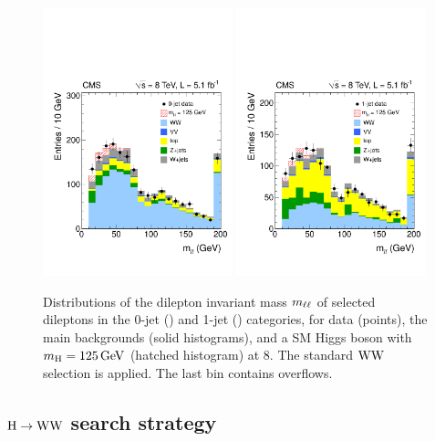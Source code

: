 \documentclass[12pt,twoside,a4paper,cmspaper,final,collab]{cms-tdr}
\begin{document}
\begin{figure}[h!t]
\begin{center}
   \includegraphics[width=0.49\textwidth]{figures/hww_wwpresel_0j_mh125_massll.pdf}
   \includegraphics[width=0.49\textwidth]{figures/hww_wwpresel_1j_mh125_massll.pdf}
	\caption{Distributions of the dilepton invariant mass $m_{\ell\ell}$ of selected dileptons
	in the 0-jet (\cmsLeft) and 1-jet (\cmsRight) categories, for data (points),
the main backgrounds (solid histograms), and a SM Higgs boson with $m_{\mathrm{H}}= 125\,\text{Ge\hspace{-.08em}V}$
(hatched histogram) at 8\TeV. The standard $\mathrm{W}\mathrm{W}$
selection is applied. The last bin contains overflows.}  \label{fig:wwpresel_nj_mh125_massll}
\end{center}
\end{figure}

\subsection{\texorpdfstring{$\mathrm{H} \to \mathrm{W}\mathrm{W}$}{Higgs to WW} search strategy}
\label{sec:hww}
\end{document}
